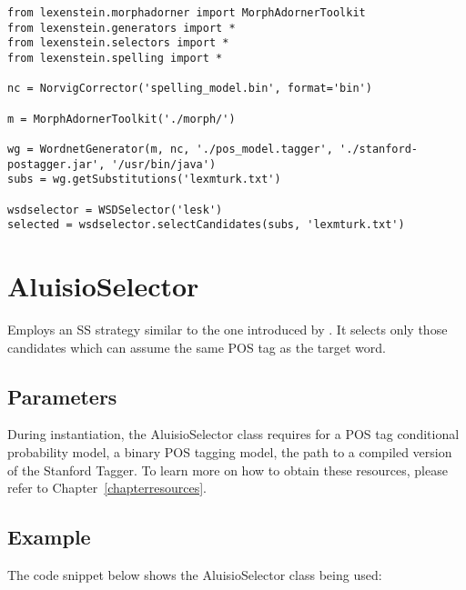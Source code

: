 \begin{lstlisting}
from lexenstein.morphadorner import MorphAdornerToolkit
from lexenstein.generators import *
from lexenstein.selectors import *
from lexenstein.spelling import *

nc = NorvigCorrector('spelling_model.bin', format='bin')

m = MorphAdornerToolkit('./morph/')

wg = WordnetGenerator(m, nc, './pos_model.tagger', './stanford-postagger.jar', '/usr/bin/java')
subs = wg.getSubstitutions('lexmturk.txt')

wsdselector = WSDSelector('lesk')
selected = wsdselector.selectCandidates(subs, 'lexmturk.txt')
\end{lstlisting}
















\section{AluisioSelector}

Employs an SS strategy similar to the one introduced by \cite{Aluisio09}. It selects only those candidates which can assume the same POS tag as the target word.

\subsection{Parameters}

During instantiation, the AluisioSelector class requires for a POS tag conditional probability model, a binary POS tagging model, the path to a compiled version of the Stanford Tagger. To learn more on how to obtain these resources, please refer to Chapter~\ref{chapterresources}.

\subsection{Example}

The code snippet below shows the AluisioSelector class being used:


